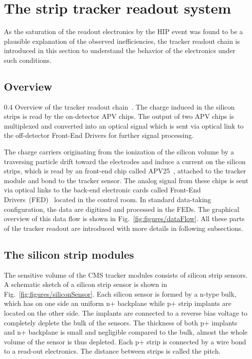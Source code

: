 \section{The strip tracker readout system}

As the saturation of the readout electronics by the HIP event was found to be a plausible explanation of the observed inefficiencies, the tracker readout chain is introduced in this section to understand the behavior of the electronics under such conditions.


\subsection{Overview}

                 {0.4}       %
                 {Overview of the tracker readout chain~\cite{Bainbridge:2004jc}. The charge induced in the silicon strips is read by the on-detector APV chips. The output of two APV chips is multiplexed and converted into an optical signal which is sent via optical link to the off-detector Front-End Drivers for further signal processing. } %

The charge carriers originating from the ionization of the silicon volume by a traversing particle drift toward the electrodes and induce a current on the silicon strips, which is read by an front-end chip called APV25~\cite{French:2001xb}, attached to the tracker module and bond to the tracker sensor. The analog signal from these chips is sent via optical links to the back-end electronic cards called Front-End Drivers~(FED)~\cite{Baird:2002wg} located in the control room. In standard data-taking configuration, the data are digitized and processed in the FEDs. The graphical overview of this data flow is shown in Fig.~\ref{fig:figures/dataFlow}. All these parts of the tracker readout are introduced with more details in following subsections.

\subsection{The silicon strip modules}

The sensitive volume of the CMS tracker modules consists of silicon strip sensors. A schematic sketch of a silicon strip sensor is shown in Fig.~\ref{fig:figures/siliconSensor}. Each silicon sensor is formed by a n-type bulk, which has on one side an uniform n+ backplane while p+ strip implants are located on the other side. The implants are connected to a reverse bias voltage to completely deplete the bulk of the sensors. The thickness of both p+ implants and n+ backplane is small and negligible compared to the bulk, almost the whole volume of the sensor is thus depleted. Each p+ strip is connected by a wire bond to a read-out electronics. The distance between strips is called the pitch. 

